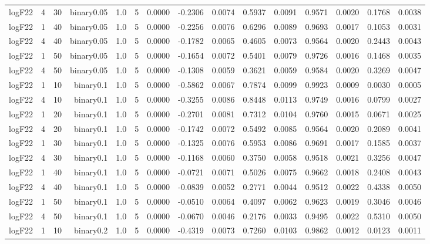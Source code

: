 \begin{longtable}{rrrrrrrrrrrrrrr}
  logF22 & 4 & 30 & binary0.05 & 1.0 & 5 & 0.0000 & -0.2306 & 0.0074 & 0.5937 & 0.0091 & 0.9571 & 0.0020 & 0.1768 & 0.0038 \\ 
  logF22 & 1 & 40 & binary0.05 & 1.0 & 5 & 0.0000 & -0.2256 & 0.0076 & 0.6296 & 0.0089 & 0.9693 & 0.0017 & 0.1053 & 0.0031 \\ 
  logF22 & 4 & 40 & binary0.05 & 1.0 & 5 & 0.0000 & -0.1782 & 0.0065 & 0.4605 & 0.0073 & 0.9564 & 0.0020 & 0.2443 & 0.0043 \\ 
  logF22 & 1 & 50 & binary0.05 & 1.0 & 5 & 0.0000 & -0.1654 & 0.0072 & 0.5401 & 0.0079 & 0.9726 & 0.0016 & 0.1468 & 0.0035 \\ 
  logF22 & 4 & 50 & binary0.05 & 1.0 & 5 & 0.0000 & -0.1308 & 0.0059 & 0.3621 & 0.0059 & 0.9584 & 0.0020 & 0.3269 & 0.0047 \\ 
  logF22 & 1 & 10 & binary0.1 & 1.0 & 5 & 0.0000 & -0.5862 & 0.0067 & 0.7874 & 0.0099 & 0.9923 & 0.0009 & 0.0030 & 0.0005 \\ 
  logF22 & 4 & 10 & binary0.1 & 1.0 & 5 & 0.0000 & -0.3255 & 0.0086 & 0.8448 & 0.0113 & 0.9749 & 0.0016 & 0.0799 & 0.0027 \\ 
  logF22 & 1 & 20 & binary0.1 & 1.0 & 5 & 0.0000 & -0.2701 & 0.0081 & 0.7312 & 0.0104 & 0.9760 & 0.0015 & 0.0671 & 0.0025 \\ 
  logF22 & 4 & 20 & binary0.1 & 1.0 & 5 & 0.0000 & -0.1742 & 0.0072 & 0.5492 & 0.0085 & 0.9564 & 0.0020 & 0.2089 & 0.0041 \\ 
  logF22 & 1 & 30 & binary0.1 & 1.0 & 5 & 0.0000 & -0.1325 & 0.0076 & 0.5953 & 0.0086 & 0.9691 & 0.0017 & 0.1585 & 0.0037 \\ 
  logF22 & 4 & 30 & binary0.1 & 1.0 & 5 & 0.0000 & -0.1168 & 0.0060 & 0.3750 & 0.0058 & 0.9518 & 0.0021 & 0.3256 & 0.0047 \\ 
  logF22 & 1 & 40 & binary0.1 & 1.0 & 5 & 0.0000 & -0.0721 & 0.0071 & 0.5026 & 0.0075 & 0.9662 & 0.0018 & 0.2408 & 0.0043 \\ 
  logF22 & 4 & 40 & binary0.1 & 1.0 & 5 & 0.0000 & -0.0839 & 0.0052 & 0.2771 & 0.0044 & 0.9512 & 0.0022 & 0.4338 & 0.0050 \\ 
  logF22 & 1 & 50 & binary0.1 & 1.0 & 5 & 0.0000 & -0.0510 & 0.0064 & 0.4097 & 0.0062 & 0.9623 & 0.0019 & 0.3046 & 0.0046 \\ 
  logF22 & 4 & 50 & binary0.1 & 1.0 & 5 & 0.0000 & -0.0670 & 0.0046 & 0.2176 & 0.0033 & 0.9495 & 0.0022 & 0.5310 & 0.0050 \\ 
  logF22 & 1 & 10 & binary0.2 & 1.0 & 5 & 0.0000 & -0.4319 & 0.0073 & 0.7260 & 0.0103 & 0.9862 & 0.0012 & 0.0123 & 0.0011 \\ 

\end{longtable}
